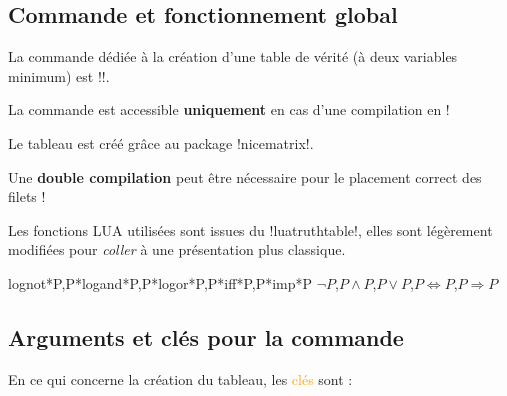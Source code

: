 \documentclass[french,a4paper,11pt]{article}
\newcommand\Cle[1]{{\small\sffamily\textlangle \textcolor{orange}{#1}\textrangle}}
\begin{document}
{{\subsection{Commande et fonctionnement global}

\begin{cautionblock}
La commande dédiée à la création d'une table de vérité (à deux variables minimum) est \motcletex!\TableVerite!.

La commande est accessible \textbf{uniquement} en cas d'une compilation en  !

Le tableau est créé grâce au package \packagetex!nicematrix!.
\end{cautionblock}

\begin{importantblock}
Une \textbf{double compilation} peut être nécessaire pour le placement correct des filets !

Les fonctions \textsf{LUA} utilisées sont issues du \packagetex!luatruthtable!, elles sont légèrement modifiées pour \textit{coller} à une présentation plus classique.
\end{importantblock}

\begin{DemoCode}
\end{DemoCode}

\begin{DemoCode}[]
%
	{lognot*P,P*logand*P,P*logor*P,P*iff*P,P*imp*P}%
	{$\lnot P$,$P \land P$,$P \lor P$,$P \Leftrightarrow P$,$P \Rightarrow P$}
\end{DemoCode}

\begin{DemoCode}[]
\end{DemoCode}

\subsection{Arguments et clés pour la commande}

\begin{DemoCode}
\end{DemoCode}

\begin{tipblock}
En ce qui concerne la création du tableau, les \Cle{clés} sont :


\end{tipblock}}}
\end{document}
